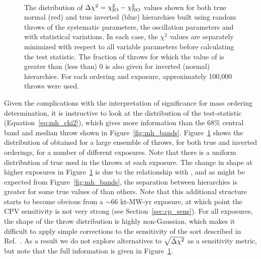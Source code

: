 \begin{figure*}[htbp]
  \centering
  \\
  \caption{The distribution of $\Delta\chi^{2} = \chi^{2}_{\mathrm{IO}} - \chi^{2}_{\mathrm{NO}}$ values shown for both true normal (red) and true inverted (blue) hierarchies built using random throws of the systematic parameters, the oscillation parameters and with statistical variations. In each case, the $\chi^{2}$ values are separately minimized with respect to all variable parameters before calculating the test statistic. The fraction of throws for which the value of \dchisq is greater than (less than) 0 is also given for inverted (normal) hierarchies. For each ordering and exposure, approximately 100,000 throws were used.}
  \label{fig:mh_comp_over_time}
\end{figure*}
Given the complications with the interpretation of significance for mass ordering determination, it is instructive to look at the distribution of the test-statistic (Equation~\ref{eq:mh_chi2}), which gives more information than the 68\% central band and median throw shown in Figure~\ref{fig:mh_bands}. Figure~\ref{fig:mh_comp_over_time} shows the distribution of \dchisq obtained for a large ensemble of throws, for both true and inverted orderings, for a number of different exposures. Note that there is a uniform distribution of true \deltacp used in the throws at each exposure. The change in shape at higher exposures in Figure~\ref{fig:mh_comp_over_time} is due to the relationship with \deltacp, and as might be expected from Figure~\ref{fig:mh_bands}, the separation between hierarchies is greater for some true values of \deltacp than others. Note that this additional structure starts to become obvious from a $\sim$66 kt-MW-yr exposure, at which point the CPV sensitivity is not very strong (see Section~\ref{sec:cp_sens}). For all exposures, the shape of the throw distribution is highly non-Gaussian, which makes it difficult to apply simple corrections to the sensitivity of the sort described in Ref.~\cite{Blennow:2013oma}. As a result we do not explore alternatives to $\sqrt{\Delta\chi^{2}}$ as a sensitivity metric, but note that the full information is given in Figure~\ref{fig:mh_comp_over_time}.

